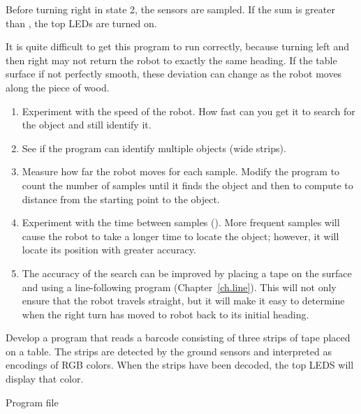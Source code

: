 Before turning right in state 2, the sensors are sampled.
If the sum is greater than , the top LEDs are turned on.


It is quite difficult to get this program to run correctly,
because turning left and then right may not return the robot
to exactly the same heading. If the table surface if not perfectly
smooth, these deviation can change as the robot moves along the piece of wood.


\begin{enumerate}

\item Experiment with the speed of the robot. How fast can you get it to
search for the object and still identify it.

\item See if the program can identify multiple objects (wide strips).

\item Measure how far the robot moves for each sample.
Modify the program to count the number of samples until it finds the object
and then to compute to distance from the starting point to the object.

\item Experiment with the time between samples ().
More frequent samples will cause the robot to take a longer time
to locate the object; however, it will locate its position
with greater accuracy.

\item The accuracy of the search can be improved by
placing a tape on the surface and using a line-following program
(Chapter~\ref{ch.line}). This will not only ensure that the robot travels
straight, but it will make it easy to determine when the right turn
has moved to robot back to its initial heading.

\end{enumerate}

\newpage


Develop a program that reads a barcode consisting of three strips of
tape placed on a table. The strips are detected by the ground sensors
and interpreted as encodings of RGB colors. When the strips have been
decoded, the top LEDS will display that color.

{\raggedleft \hfill Program file }

